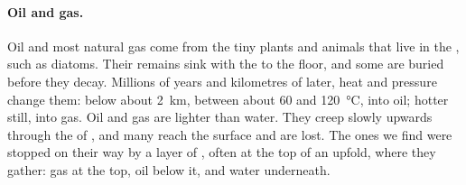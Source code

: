 \paragraph{Oil and gas.} Oil and most natural gas come from the tiny
plants and animals that live in the , such as diatoms. Their remains
sink with the  to the  floor, and some are buried before they decay.
Millions of years and kilometres of  later, heat and pressure
change them: below about \qty{2}{km}, between about 60 and
\qty{120}{\degreeCelsius}, into oil; hotter still, into gas. Oil and gas
are lighter than water. They creep slowly upwards through the  of
 , and many reach the surface and are lost. The ones we find
were stopped on their way by a layer of  , often at the
top of an upfold, where they gather: gas at the top, oil below it, and
water underneath.

